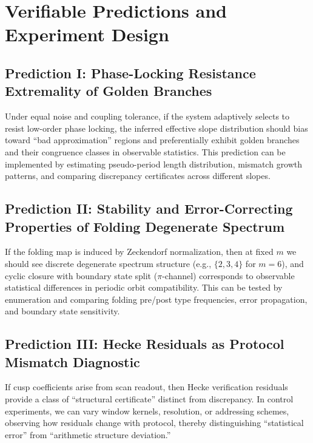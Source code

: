 \section{Verifiable Predictions and Experiment Design}

\subsection{Prediction I: Phase-Locking Resistance Extremality of Golden Branches}

Under equal noise and coupling tolerance, if the system adaptively selects to resist low-order phase locking, the inferred effective slope distribution should bias toward ``bad approximation'' regions and preferentially exhibit golden branches and their congruence classes in observable statistics. This prediction can be implemented by estimating pseudo-period length distribution, mismatch growth patterns, and comparing discrepancy certificates across different slopes.

\subsection{Prediction II: Stability and Error-Correcting Properties of Folding Degenerate Spectrum}

If the folding map is induced by Zeckendorf normalization, then at fixed $m$ we should see discrete degenerate spectrum structure (e.g., $\{2,3,4\}$ for $m=6$), and cyclic closure with boundary state split ($\pi$-channel) corresponds to observable statistical differences in periodic orbit compatibility. This can be tested by enumeration and comparing folding pre/post type frequencies, error propagation, and boundary state sensitivity.

\subsection{Prediction III: Hecke Residuals as Protocol Mismatch Diagnostic}

If cusp coefficients arise from scan readout, then Hecke verification residuals provide a class of ``structural certificate'' distinct from discrepancy. In control experiments, we can vary window kernels, resolution, or addressing schemes, observing how residuals change with protocol, thereby distinguishing ``statistical error'' from ``arithmetic structure deviation.''
